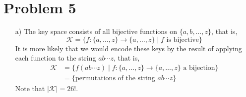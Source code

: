 \documentclass[12pt]{article}
\numberwithin{equation}{section}
\theoremstyle{plain}
\newcommand{\set}[1]{\{ #1 \}}
\newcommand{\keys}{\mathcal{K}}
\begin{document}
\section*{Problem 5}
\begin{enumerate}
    \item[a)] The key space consists of all bijective functions on $\set{ a, b, \ldots, z }$, that is,
    \begin{equation*}
        \keys = \set{ f:\set{a, \ldots, z} \to \set{a, \ldots, z} \mid f \text{ is bijective}}
    \end{equation*}
    It is more likely that we would encode these keys by the result of applying each function to the string $ab\cdots z$,
    that is,
    \begin{align*}
        \keys 
            &= \set{ f(ab\cdots z) \mid f:\set{a, \ldots, z} \to \set{a, \ldots, z} \text{ a bijection} }\\
            &= \set{ \text{permutations of the string } ab\cdots z }
    \end{align*}
    Note that $|\keys| = 26!$.
    

\end{enumerate}
\end{document}
